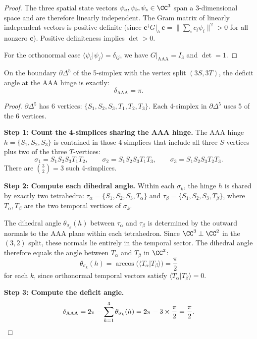 \begin{proof}
The three spatial state vectors $\psi_a, \psi_b, \psi_c \in \CC^3$
span a 3-dimensional space and are therefore linearly independent.
The Gram matrix of linearly independent vectors is positive definite
(since $\mathbf{c}^\dagger G|_h\, \mathbf{c} =
\|\sum_i c_i \psi_i\|^2 > 0$ for all nonzero $\mathbf{c}$).
Positive definiteness implies $\det > 0$.

For the orthonormal case $\langle \psi_i | \psi_j \rangle = \delta_{ij}$,
we have $G|_{\mathrm{AAA}} = I_3$ and $\det = 1$.
\end{proof}

\begin{lemma}
\label{lem:delta}
On the boundary $\partial\Delta^5$ of the 5-simplex with the vertex
split $(3S, 3T)$, the deficit angle at the AAA hinge is exactly:
\begin{equation}
\boxed{\delta_{\mathrm{AAA}} = \pi.}
\end{equation}
\end{lemma}

\begin{proof}
$\partial\Delta^5$ has 6 vertices: $\{S_1, S_2, S_3, T_1, T_2, T_3\}$.
Each 4-simplex in $\partial\Delta^5$ uses 5 of the 6 vertices.

\medskip\noindent
\textbf{Step 1: Count the 4-simplices sharing the AAA hinge.}
The AAA hinge $h = \{S_1, S_2, S_3\}$ is contained in those 4-simplices
that include all three $S$-vertices plus two of the three $T$-vertices:
\begin{equation}
\sigma_1 = S_1 S_2 S_3 T_1 T_2, \qquad
\sigma_2 = S_1 S_2 S_3 T_1 T_3, \qquad
\sigma_3 = S_1 S_2 S_3 T_2 T_3.
\end{equation}
There are $\binom{3}{2} = 3$ such 4-simplices.

\medskip\noindent
\textbf{Step 2: Compute each dihedral angle.}
Within each $\sigma_k$, the hinge $h$ is shared by exactly two
tetrahedra: $\tau_\alpha = \{S_1, S_2, S_3, T_\alpha\}$ and
$\tau_\beta = \{S_1, S_2, S_3, T_\beta\}$, where $T_\alpha, T_\beta$
are the two temporal vertices of $\sigma_k$.

The dihedral angle $\theta_{\sigma_k}(h)$ between $\tau_\alpha$ and
$\tau_\beta$ is determined by the outward normals to the AAA plane
within each tetrahedron. Since $\CC^3 \perp \CC^2$ in
the $(3,2)$ split, these normals lie entirely in the temporal sector.
The dihedral angle therefore equals the angle between $T_\alpha$ and
$T_\beta$ in $\CC^2$:
\begin{equation}
\theta_{\sigma_k}(h) =
\arccos\bigl(\langle T_\alpha | T_\beta \rangle\bigr) = \frac{\pi}{2}
\end{equation}
for each $k$, since orthonormal temporal vectors satisfy
$\langle T_\alpha | T_\beta \rangle = 0$.

\medskip\noindent
\textbf{Step 3: Compute the deficit angle.}
\begin{equation}
\delta_{\mathrm{AAA}} = 2\pi - \sum_{k=1}^{3} \theta_{\sigma_k}(h)
= 2\pi - 3 \times \frac{\pi}{2} = \frac{\pi}{2}. \qedhere
\end{equation}
\end{proof}


